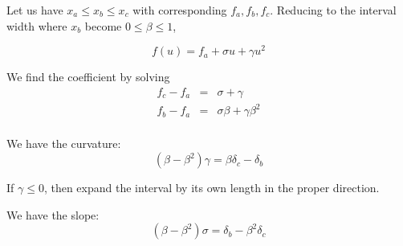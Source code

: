 \documentclass[aps,12pt]{revtex4}
\begin{document}
Let us have $x_a\leq x_b \leq x_c$ with corresponding $f_a,f_b,f_c$.
Reducing to the interval width where $x_b$ become $0\leq \beta \leq 1$, 

\begin{equation}
	f(u) = f_a + \sigma u + \gamma u^2
\end{equation}

We find the coefficient by solving
\begin{equation}
\begin{array}{rcl}
	f_c - f_a & = & \sigma + \gamma\\
	f_b - f_a & = & \sigma \beta + \gamma \beta^2\\
\end{array}
\end{equation}

We have the curvature:
\begin{equation}
(\beta-\beta^2) \gamma = \beta \delta_c - \delta_b
\end{equation}

If $\gamma\leq0$, then expand the interval by its own length in the proper direction.

We have the slope:
\begin{equation}
(\beta-\beta^2) \sigma = \delta_b - \beta^2 \delta_c
\end{equation}
\end{document}
